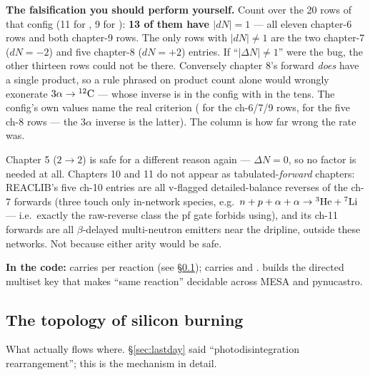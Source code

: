 \begin{exercise}
\textbf{The falsification you should perform yourself.} Count  over the
20 rows of that config (11 for , 9 for ): \textbf{13 of them
have $|dN| = 1$} --- all eleven chapter-6 rows and both chapter-9 rows. The only
rows with $|dN| \neq 1$ are the two chapter-7 ($dN = -2$) and five chapter-8
($dN = +2$) entries. If ``$|\Delta N| \neq 1$'' were the bug, the other thirteen
rows could not be there. Conversely chapter 8's forward \emph{does} have a
single product, so a rule phrased on product count alone would wrongly exonerate
$3\alpha \to \nuc{C}{12}$ --- whose inverse is in the config with
 in the tens. The config's own  values name the real
criterion ( for the ch-6/7/9 rows,
 for the five ch-8 rows --- the $3\alpha$ inverse is
the latter). The  column is how far wrong the rate was.
\end{exercise}

Chapter 5 ($2\to2$) is safe for a different reason again --- $\Delta N = 0$, so
no factor is needed at all. Chapters 10 and 11 do not appear as
tabulated-\emph{forward} chapters: REACLIB's five ch-10 entries are all
v-flagged detailed-balance reverses of the ch-7 forwards (three touch only
in-network species, e.g.\ $n+p+\alpha+\alpha \to \nuc{He}{3}+\nuc{Li}{7}$ ---
i.e.\ exactly the raw-reverse class the pf gate forbids using), and its ch-11
forwards are all $\beta$-delayed multi-neutron emitters near the dripline,
outside these networks. Not because either arity would be safe.

\begin{repopointer}
\textbf{In the code:}
 carries  per
reaction (see \S\ref{sec:topology});
 carries  and
.  builds the directed multiset key that
makes ``same reaction'' decidable across MESA and pynucastro.
\end{repopointer}

\subsection{The topology of silicon burning}
\label{sec:topology}

What actually flows where. \S\ref{sec:lastday} said ``photodisintegration
rearrangement''; this is the mechanism in detail.

